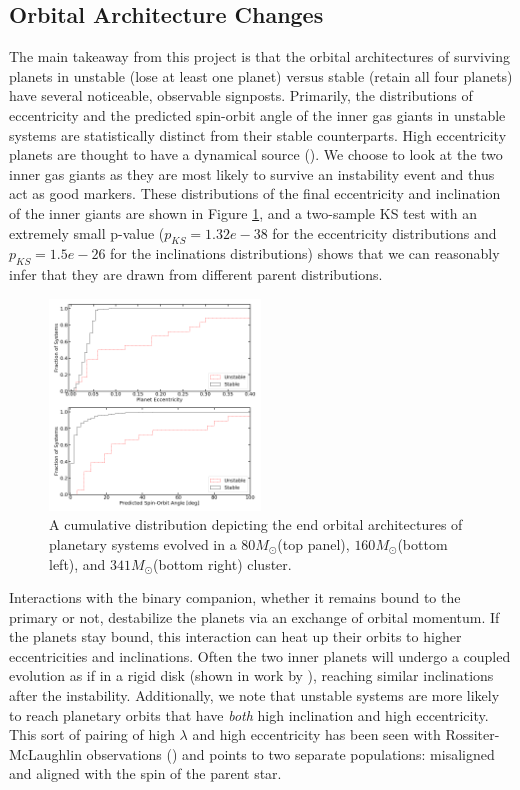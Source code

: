 \documentclass{aastex631}
\begin{document}
\subsection{Orbital Architecture Changes}
The main takeaway from this project is that the orbital architectures of surviving planets in unstable (lose at least one planet)
 versus stable (retain all four planets) have several noticeable, observable signposts. 
 Primarily, the distributions of eccentricity and the predicted spin-orbit angle of the inner gas giants in 
 unstable systems are statistically distinct from their stable counterparts. High eccentricity planets are thought to have a dynamical source (\cite{dlfm97}).
  We choose to look at the 
 two inner gas giants as they are most likely to survive an instability event and thus act as good markers.
These distributions of the final eccentricity and inclination of the inner giants are shown in Figure \ref{fig:160_ecc_inc}, 
 and a two-sample KS test with an extremely small p-value ($p_{KS} = 1.32e-38$ for the eccentricity distributions
 and $p_{KS} = 1.5e-26$ for the inclinations distributions) shows that we can reasonably infer that they are drawn from different parent distributions. 
\begin{figure}[h!]
    \centering
    \includegraphics[width=0.5\textwidth]{fig/cumulative_ecc_inc_bigfont80.png}
    
    \caption{A cumulative distribution depicting the end orbital architectures of planetary systems evolved in a $80M_{\odot}$(top panel), $160M_{\odot}$(bottom left), 
    and $341M_{\odot}$(bottom right) cluster.}
    \label{fig:160_ecc_inc}
\end{figure}
Interactions with the binary companion, whether it remains bound to the primary or not, destabilize the planets via an exchange of orbital 
momentum. If the planets stay bound, this interaction can heat up their orbits to higher eccentricities and inclinations. Often the two
inner planets will undergo a coupled evolution as if in a rigid disk (shown in work by \cite{ina97}), reaching similar inclinations after the instability. 
Additionally, we note that unstable systems are more likely to reach planetary orbits that have \textit{both} high inclination and high eccentricity. This 
sort of pairing of high $\lambda$ and high eccentricity has been seen with Rossiter-McLaughlin observations
(\cite{sch10}) and points to two separate populations: misaligned and aligned with the 
spin of the parent star.
\end{document}
